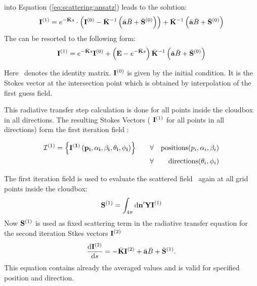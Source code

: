 into Equation (\ref{eq:scattering:ansatz}) leads to the solution:
\begin{eqnarray}
  {\bf I}^{(1)} =  e^{-\bar{{\bf K}}s}\cdot\left({\bf I}^{(0)} -\bar{{\bf K}}^{-1}\left(\bar{{\bf a}} \bar{B} +\bar{{\bf S}}^{(0)}\right)\right) + 
 \bar{{\bf K}}^{-1}\left(\bar{{\bf a}} \bar{B} +\bar{{\bf S}}^{(0)}\right)
\end{eqnarray}
The can be resorted to the following form:
\begin{eqnarray}
\label{eq:scattering:vrte_sol}
 {\bf I}^{(1)} =  e^{-\bar{{\bf K}}s} {\bf I}^{(0)} + \left( {\bf E} -  e^{-\bar{{\bf K}}s}\right)  \bar{{\bf K}}^{-1}\left(\bar{{\bf a}} \bar{B} +\bar{{\bf S}}^{(0)}\right)
\end{eqnarray}

Here \IdnMat\ denotes the identity matrix.  ${\bf I}^{(0)}$ is given
by the initial condition. It is the Stokes vector at the intersection
point which is obtained by interpolation of the first guess field.

This radiative transfer step calculation is done for all points inside
the cloudbox in all directions. The resulting Stokes Vectors (
${\bf I}^{(1)}$ for all points in all directions) form the first
iteration field :

\begin{eqnarray}
{\mathcal I}^{(1)} = \left\{ \bf{I}^{(1)} \left( p_i, \alpha_i, \beta_i, \theta_i, \phi_i\right)\right\}  \qquad  
&\forall& {\rm positions } (p_i,\alpha_i, \beta_i)\\
&\forall& {\rm directions } (\theta_i,\phi_i)
\end{eqnarray}



The first iteration field is used to evaluate the scattered field
\ScaInt\ again at all grid points inside the cloudbox:
\begin{eqnarray}
  {\bf S}^{(1)} = \int_{4\pi} \mathrm{d} {\bf n}^\prime
  {\bf Y} {\bf I}^{(1)} 
\end{eqnarray}
Now ${\bf S}^{(1)}$ is used as fixed scattering term in the radiative
transfer equation for the second iteration Stkes vectors
${\bf I}^{(2)}$
\begin{eqnarray}
     \frac{\mathrm{d} {\bf I}^{(2)}}{\mathrm{d} s} =
     -\bar{{\bf K}} {\bf I}^{(2)} + \bar{{\bf a}} \bar{B}
     +\bar{{\bf S}}^{(1)}.
\end{eqnarray} 
This equation contains already the averaged values and is valid for
specified position and direction.
 
